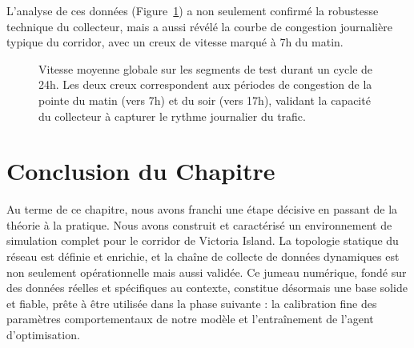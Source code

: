 
L'analyse de ces données (Figure~\ref{fig:courbe_vitesse_24h_final}) a non seulement confirmé la robustesse technique du collecteur, mais a aussi révélé la courbe de congestion journalière typique du corridor, avec un creux de vitesse marqué à 7h du matin.

\begin{figure}[htbp]
    \centering
    \caption{Vitesse moyenne globale sur les segments de test durant un cycle de 24h. Les deux creux correspondent aux périodes de congestion de la pointe du matin (vers 7h) et du soir (vers 17h), validant la capacité du collecteur à capturer le rythme journalier du trafic.}
    \label{fig:courbe_vitesse_24h_final}
\end{figure}

\section{Conclusion du Chapitre}
\label{sec:conclusion_construction_jn_final}

Au terme de ce chapitre, nous avons franchi une étape décisive en passant de la théorie à la pratique. Nous avons construit et caractérisé un environnement de simulation complet pour le corridor de Victoria Island. La topologie statique du réseau est définie et enrichie, et la chaîne de collecte de données dynamiques est non seulement opérationnelle mais aussi validée. Ce jumeau numérique, fondé sur des données réelles et spécifiques au contexte, constitue désormais une base solide et fiable, prête à être utilisée dans la phase suivante : la calibration fine des paramètres comportementaux de notre modèle et l'entraînement de l'agent d'optimisation.